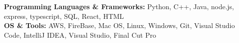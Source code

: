 

\begin{cvparagraph}

\textbf{Programming Languages \& Frameworks:}  Python, C++, Java, node.js, express,  typescript, SQL, React, HTML
\\[2pt]
\textbf{OS \& Tools:} AWS,  FireBase, Mac OS, Linux, Windows, Git, Visual Studio Code, IntelliJ IDEA, Visual Studio, Final Cut Pro


\end{cvparagraph}
